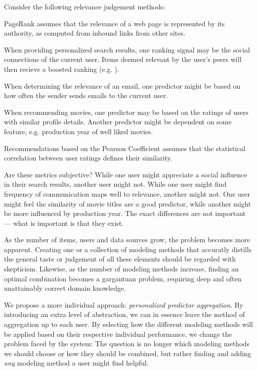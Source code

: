 Consider the following relevance judgement methods:

\begin{itemize*}
  \item PageRank \citep{Bender2005} assumes that the relevance of a web page is 
  represented by its authority, as computed from inbound links from other sites.
  \item When providing personalized search results, one ranking signal may be 
  the social connections of the current user. Items deemed relevant by the user's 
  peers will then recieve a boosted ranking (e.g. \cite{Carmel2009}).
  \item When determining the relevance of an email, one predictor might be based
  on how often the sender sends emails to the current user.
  \item When recommending movies, one predictor may be based on the ratings
  of users with similar profile details. Another predictor might be 
  dependent on some feature, e.g. production year of well liked movies.
  \item Recommendations based on the Pearson Coefficient \cite[p11]{Segaran2007}
  assumes that the statistical correlation between user ratings defines their 
  similarity.
\end{itemize*}

Are these metrics subjective? While one user might appreciate a social
influence in their search results, another user might not.
While one user might find frequency of communication maps well to relevance,
another might not. 
One user might feel the similarity of movie titles are a good predictor,
while another might be more influenced by production year.
The exact differences are not important --- what is important is that they exist.

As the number of items, users and data sources grow, the problem becomes more apparent.
Creating one or a collection of modeling methods that accuratly distills the general
taste or judgement of all these elements should be regarded with skepticism.
Likewise, as the number of modeling methods increase, finding an optimal combination
becomes a gargantuan problem, requiring deep and often unattainably correct domain knowledge.

We propose a more individual approach: \emph{personalized predictor aggregation}.
By introducing an extra level of abstraction, we can in essence leave the method of aggregation
up to each user. By selecting how the different modeling methods will be applied based
on their respective individual performance, we change the problem faced by the system:
The question is no longer which modeling methods we should choose or how they should be combined,
but rather finding and adding \emph{any} modeling method a user might find helpful.

